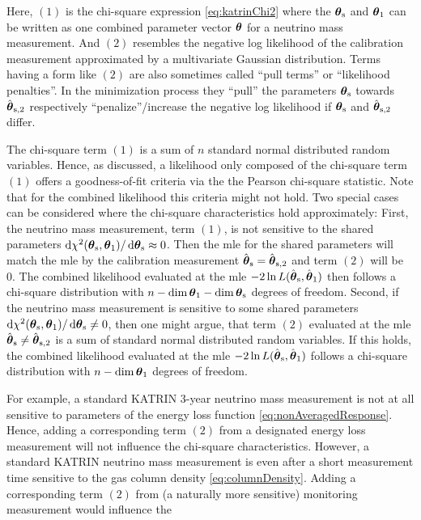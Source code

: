 Here, $(1)$ is the chi-square expression \eqref{eq:katrinChi2} where the $\boldsymbol{\mathbf{\theta}}_\mathrm{s}$ and $\boldsymbol{\mathbf{\theta}}_1$ can be written as one combined parameter vector $\boldsymbol{\mathbf{\theta}}$ for a neutrino mass measurement. And $(2)$ resembles the negative log likelihood of the calibration measurement approximated by a multivariate Gaussian distribution. Terms having a form like $(2)$ are also sometimes called ``pull terms'' or ``likelihood penalties''. In the minimization process they ``pull'' the parameters $\boldsymbol{\mathbf{\theta}}_\mathrm{s}$ towards $\hat{\boldsymbol{\mathbf{\theta}}}_\mathrm{s,2}$ respectively ``penalize''/increase the negative log likelihood if $\boldsymbol{\mathbf{\theta}}_\mathrm{s}$ and $\hat{\boldsymbol{\mathbf{\theta}}}_\mathrm{s,2}$ differ.


\newcommand{\CombLmax}{-2\ln L(\hat{\paramVec}_\mathrm{s}, \hat{\paramVec}_1)}
The chi-square term $(1)$ is a sum of $n$ standard normal distributed random variables. Hence, as discussed, a likelihood only composed of the chi-square term $(1)$ offers a goodness-of-fit criteria via the the Pearson chi-square statistic. Note that for the combined likelihood this criteria might not hold. Two special cases can be considered where the chi-square characteristics hold approximately: First, the neutrino mass measurement, term $(1)$, is not sensitive to the shared parameters $\mathop{}\!\mathrm{d} \chi^2(\boldsymbol{\mathbf{\theta}}_\mathrm{s}, \boldsymbol{\mathbf{\theta}}_1) /\mathop{}\!\mathrm{d} \boldsymbol{\mathbf{\theta}}_\mathrm{s} \approx 0$. Then the \gls{mle} for the shared parameters will match the \gls{mle} by the calibration measurement $\hat{\boldsymbol{\mathbf{\theta}}}_\mathrm{s} = \hat{\boldsymbol{\mathbf{\theta}}}_{\mathrm{s},2}$ and term $(2)$ will be 0. The combined likelihood evaluated at the \gls{mle} $\CombLmax$ then follows a chi-square distribution with $n-\dim\boldsymbol{\mathbf{\theta}}_1-\dim\boldsymbol{\mathbf{\theta}}_\mathrm{s}$ degrees of freedom. Second, if the neutrino mass measurement is sensitive to some shared parameters $\mathop{}\!\mathrm{d} \chi^2(\boldsymbol{\mathbf{\theta}}_\mathrm{s}, \boldsymbol{\mathbf{\theta}}_1) /\mathop{}\!\mathrm{d} \boldsymbol{\mathbf{\theta}}_\mathrm{s} \neq 0$, then one might argue, that term $(2)$ evaluated at the \gls{mle} $\hat{\boldsymbol{\mathbf{\theta}}}_\mathrm{s} \neq \hat{\boldsymbol{\mathbf{\theta}}}_{\mathrm{s},2}$ is a sum of standard normal distributed random variables. If this holds, the combined likelihood evaluated at the \gls{mle} $\CombLmax$ follows a chi-square distribution with $n-\dim\boldsymbol{\mathbf{\theta}}_1$ degrees of freedom.


For example, a standard KATRIN 3-year neutrino mass measurement is not at all sensitive to parameters of the energy loss function \eqref{eq:nonAveragedResponse}. Hence, adding a corresponding term $(2)$ from a designated energy loss measurement will not influence the chi-square characteristics. However, a standard KATRIN neutrino mass measurement is even after a short measurement time sensitive to the gas column density \eqref{eq:columnDensity}. Adding a corresponding term $(2)$ from (a naturally more sensitive) monitoring measurement would influence the   


